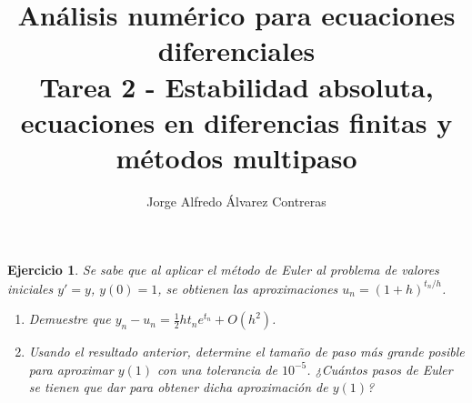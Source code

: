 \documentclass[11pt]{article}
\title{Análisis numérico para ecuaciones diferenciales \\
Tarea 2 - Estabilidad absoluta, ecuaciones en diferencias finitas y
métodos multipaso}
\author{Jorge Alfredo Álvarez Contreras}
\newtheorem{exercise}{Ejercicio}
\begin{document}
\maketitle

\begin{exercise}
   Se sabe que al aplicar el método de Euler al problema de valores
   iniciales $y'=y$, $y(0)=1$, se obtienen las aproximaciones
   $u_n=(1+h)^{t_n / h}$.
   \begin{enumerate}
     \item
       Demuestre que $y_n-u_n = \frac{1}{2}ht_ne^{t_n}+O(h^{2})$.
     \item
       Usando el resultado anterior, determine el tamaño de paso más
       grande posible para aproximar $y(1)$ con una tolerancia de
       $10^{-5}$. ¿Cuántos pasos de Euler se tienen que dar para
       obtener dicha aproximación de $y(1)$?
   \end{enumerate}
\end{exercise}
\end{document}
